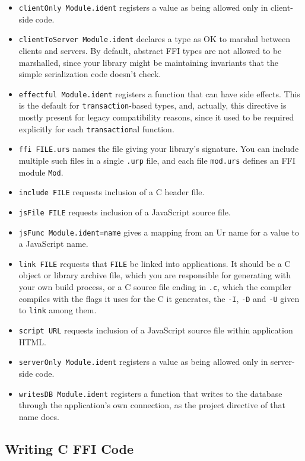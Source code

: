 \documentclass{article}
\begin{document}
\begin{itemize}
\item \texttt{clientOnly Module.ident} registers a value as being allowed only in client-side code.
\item \texttt{clientToServer Module.ident} declares a type as OK to marshal between clients and servers.  By default, abstract FFI types are not allowed to be marshalled, since your library might be maintaining invariants that the simple serialization code doesn't check.
\item \texttt{effectful Module.ident} registers a function that can have side effects.  This is the default for \texttt{transaction}-based types, and, actually, this directive is mostly present for legacy compatibility reasons, since it used to be required explicitly for each \texttt{transaction}al function.
\item \texttt{ffi FILE.urs} names the file giving your library's signature.  You can include multiple such files in a single \texttt{.urp} file, and each file \texttt{mod.urs} defines an FFI module \texttt{Mod}.
\item \texttt{include FILE} requests inclusion of a C header file.
\item \texttt{jsFile FILE} requests inclusion of a JavaScript source file.
\item \texttt{jsFunc Module.ident=name} gives a mapping from an Ur name for a value to a JavaScript name.
\item \texttt{link FILE} requests that \texttt{FILE} be linked into applications.  It should be a C object or library archive file, which you are responsible for generating with your own build process, or a C source file ending in \texttt{.c}, which the compiler compiles with the flags it uses for the C it generates, the \texttt{-I}, \texttt{-D} and \texttt{-U} given to \texttt{link} among them.
\item \texttt{script URL} requests inclusion of a JavaScript source file within application HTML.
\item \texttt{serverOnly Module.ident} registers a value as being allowed only in server-side code.
\item \texttt{writesDB Module.ident} registers a function that writes to the database through the application's own connection, as the project directive of that name does.
\end{itemize}

\subsection{Writing C FFI Code}
\end{document}
